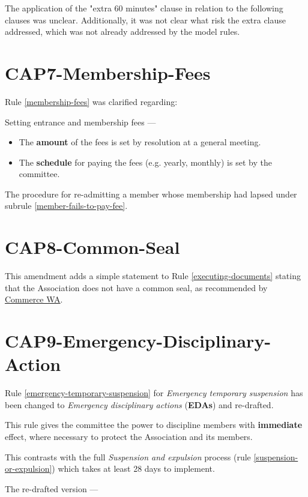 \documentclass[../constitution.tex]{subfiles}
\begin{document}
The application of the "extra 60 minutes" clause in relation to the following clauses was unclear. Additionally, it was not clear what risk the extra clause addressed, which was not already addressed by the model rules.

\section*{CAP7-Membership-Fees}

Rule \ref{membership-fees} was clarified regarding:

Setting entrance and membership fees ---

\begin{itemize}
    \item The \textbf{amount} of the fees is set by resolution at a general meeting.
    \item The \textbf{schedule} for paying the fees (e.g. yearly, monthly) is set by the committee.
\end{itemize}

The procedure for re-admitting a member whose membership had lapsed under subrule \ref{member-fails-to-pay-fee}.

\section*{CAP8-Common-Seal}

This amendment adds a simple statement to Rule \ref{executing-documents} stating that the Association does not have a common seal, as recommended by \href{https://www.commerce.wa.gov.au/publications/whats-rules}{Commerce WA}.

\section*{CAP9-Emergency-Disciplinary-Action}

Rule \ref{emergency-temporary-suspension} for \textit{Emergency temporary suspension} has been changed to \textit{Emergency disciplinary actions} (\textbf{EDAs}) and re-drafted.

This rule gives the committee the power to discipline members with \textbf{immediate} effect, where necessary to protect the Association and its members.

This contrasts with the full \textit{Suspension and expulsion} process (rule \ref{suspension-or-expulsion}) which takes at least 28 days to implement.

The re-drafted version ---
\end{document}
